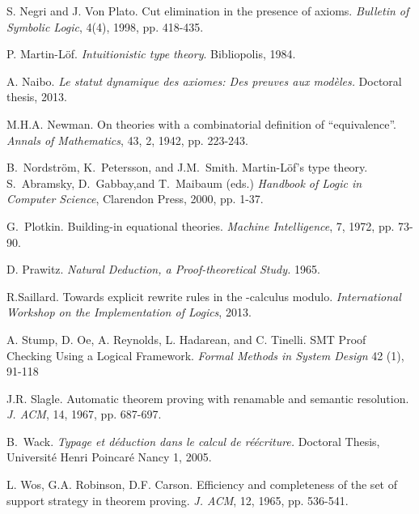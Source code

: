 \documentclass{llncs}
\begin{document}
\begin{thebibliography}{99.}
S. Negri and J. Von Plato.
Cut elimination in the presence of axioms.
{\em Bulletin of Symbolic Logic}, 4(4), 1998, pp. 418-435.

P. Martin-L\"of.
{\em Intuitionistic type theory}.
Bibliopolis, 1984.

A. Naibo.
{\em Le statut dynamique des axiomes: Des preuves aux mod\`eles.}
Doctoral thesis, 2013.

M.H.A. Newman.
On theories with a combinatorial definition of ``equivalence''. 
{\em Annals of Mathematics}, 43, 2, 1942, pp. 223-243.

 B.~Nordstr\"om, K.~Petersson, and J.M.~Smith.
Martin-L\"of's type theory. 
S.~Abramsky, D.~Gabbay,and T.~Maibaum (eds.)
{\em Handbook of Logic in Computer Science}, 
Clarendon Press, 2000, pp. 1-37.

G.~Plotkin.
Building-in equational theories.
{\em Machine Intelligence}, 7, 1972, pp. 73-90.

D. Prawitz.
{\em Natural Deduction, a Proof-theoretical Study.}
1965.

R.Saillard.
Towards explicit rewrite rules in the -calculus modulo.
{\em International Workshop on the Implementation of Logics}, 2013.

A. Stump, D. Oe, A. Reynolds, L. Hadarean, and C. Tinelli. 
SMT Proof Checking Using a Logical Framework. 
{\em Formal Methods in System Design} 42 (1), 91-118

J.R. Slagle.
Automatic theorem proving with renamable and semantic resolution.
{\em J. ACM}, 14, 1967, pp. 687-697.

B.~Wack.
{\em Typage et d\'eduction dans le calcul de r\'e\'ecriture.}
Doctoral Thesis, Universit\'e Henri Poincar\'e Nancy 1, 
2005.

L. Wos, G.A. Robinson, D.F. Carson.
Efficiency and completeness of the set of support strategy in theorem
proving.
{\em J. ACM}, 12, 1965, pp. 536-541.
\end{thebibliography}
\end{document}
